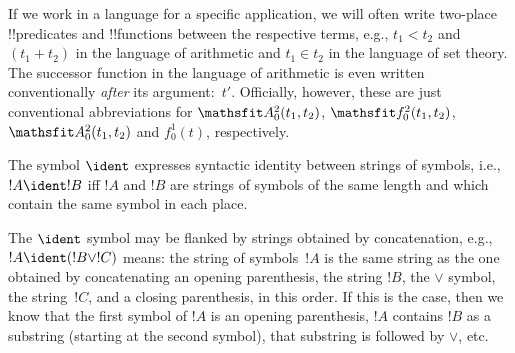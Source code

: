 \documentclass[../../../include/open-logic-section]{subfiles}
\begin{document}
If we work in a language for a specific application, we will often
write two-place !!{predicate}s and !!{function}s between the
respective terms, e.g., $t_1 < t_2$ and $(t_1 + t_2)$ in the language
of arithmetic and $t_1 \in t_2$ in the language of set theory.  The
successor function in the language of arithmetic is even written
conventionally \emph{after} its argument:~$t'$.  Officially, however,
these are just conventional abbreviations for $\Obj A^2_0(t_1, t_2)$,
$\Obj f^2_0(t_1, t_2)$, $\Obj A^2_0(t_1, t_2)$ and $f^1_0(t)$,
respectively.

\begin{defn}
The symbol $\ident$ expresses syntactic identity between strings of
symbols, i.e., $!A \ident !B$ iff $!A$ and $!B$ are strings of symbols
of the same length and which contain the same symbol in each place.
\end{defn}

The $\ident$ symbol may be flanked by strings obtained by
concatenation, e.g., $!A \ident (!B \lor !C)$ means: the string of
symbols~$!A$ is the same string as the one obtained by concatenating
an opening parenthesis, the string $!B$, the $\lor$ symbol, the
string~$!C$, and a closing parenthesis, in this order. If this is the
case, then we know that the first symbol of $!A$ is an opening
parenthesis, $!A$ contains $!B$ as a substring (starting at the second
symbol), that substring is followed by $\lor$, etc.
\end{document}
